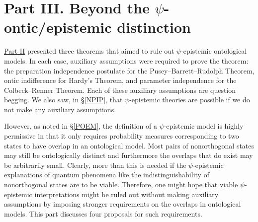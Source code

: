 \documentclass[DIV=calc,fontsize=12pt]{scrartcl} %
\theoremstyle{definition}
\theoremstyle{plain}
\begin{document}
\section*{Part III. Beyond the $\psi$-ontic/epistemic distinction\label{Beyond}}

\hyperref[SPON]{Part II} presented three theorems that aimed to rule out
$\psi$-epistemic ontological models.  In each case, auxiliary
assumptions were required to prove the theorem: the preparation
independence postulate for the Pusey--Barrett--Rudolph Theorem, ontic indifference for
Hardy's Theorem, and parameter independence for the Colbeck--Renner
Theorem.  Each of these auxiliary assumptions are question begging.
We also saw, in \S\ref{NPIP}, that $\psi$-epistemic theories are
possible if we do not make any auxiliary assumptions.

However, as noted in \S\ref{POEM}, the definition of a
$\psi$-epistemic model is highly permissive in that it only requires
probability measures corresponding to two states to have overlap in an
ontological model.  Most pairs of nonorthogonal states may still be
ontologically distinct and furthermore the overlaps that do exist may
be arbitrarily small.  Clearly, more than this is needed if the
$\psi$-epistemic explanations of quantum phenomena like the
indistinguishability of nonorthogonal states are to be viable.
Therefore, one might hope that viable $\psi$-epistemic interpretations
might be ruled out without making auxiliary assumptions by imposing
stronger requirements on the overlaps in ontological models.  This
part discusses four proposals for such requirements.
\end{document}
